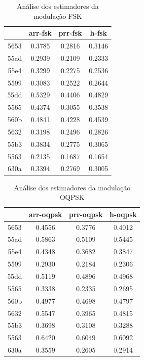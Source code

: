 \begin{table}[H]
\centering
\begin{tabular}{|c|ccc|}
\hline
\multicolumn{1}{|c|}{}     & \multicolumn{1}{c|}{arr-fsk} & \multicolumn{1}{c|}{prr-fsk} & \multicolumn{1}{c|}{h-fsk}  \\ \hline
\multicolumn{1}{|c|}{5653} & \multicolumn{1}{c}{0.3785}   & \multicolumn{1}{c}{0.2816}   & \multicolumn{1}{c|}{0.3146} \\ \cline{1-1}
55ad & 0.2939 & 0.2109 & 0.2333 \\ \cline{1-1}
55e4 & 0.3299 & 0.2275 & 0.2536 \\ \hline
5599 & 0.3083 & 0.2522 & 0.2644 \\ \cline{1-1}
55dd & 0.5329 & 0.4406 & 0.4829 \\ \cline{1-1}
5565 & 0.4374 & 0.3055 & 0.3538 \\ \cline{1-1}
560b & 0.4841 & 0.4228 & 0.4539 \\ \hline
5632 & 0.3198 & 0.2496 & 0.2826 \\ \cline{1-1}
55b3 & 0.3834 & 0.2775 & 0.3065 \\ \cline{1-1}
5563 & 0.2135 & 0.1687 & 0.1654 \\ \cline{1-1}
630a & 0.3394 & 0.2769 & 0.3005 \\ \hline
\end{tabular}
\caption{Análise dos estimadores da modulação FSK}
\label{tab:est1}
\end{table}

\begin{table}[H]
\centering
\begin{tabular}{|c|ccc|}
\hline
\multicolumn{1}{|c|}{}     & \multicolumn{1}{c|}{arr-oqpsk} & \multicolumn{1}{c|}{prr-oqpsk} & \multicolumn{1}{c|}{h-oqpsk} \\ \hline
\multicolumn{1}{|c|}{5653} & \multicolumn{1}{c}{0.4556}     & \multicolumn{1}{c}{0.3776}     & \multicolumn{1}{c|}{0.4012}  \\ \cline{1-1}
55ad & 0.5863 & 0.5109 & 0.5445 \\ \cline{1-1}
55e4 & 0.4348 & 0.3682 & 0.3847 \\ \hline
5599 & 0.2930 & 0.2184 & 0.2306 \\ \cline{1-1}
55dd & 0.5119 & 0.4896 & 0.4968 \\ \cline{1-1}
5565 & 0.3338 & 0.2335 & 0.2695 \\ \cline{1-1}
560b & 0.4977 & 0.4698 & 0.4797 \\ \hline
5632 & 0.5547 & 0.3965 & 0.4815 \\ \cline{1-1}
55b3 & 0.3698 & 0.3108 & 0.3288 \\ \cline{1-1}
5563 & 0.6420 & 0.6049 & 0.6092 \\ \cline{1-1}
630a & 0.3559 & 0.2605 & 0.2914 \\ \hline
\end{tabular}
\caption{Análise dos estimadores da modulação OQPSK}
\label{tab:est2}
\end{table}

